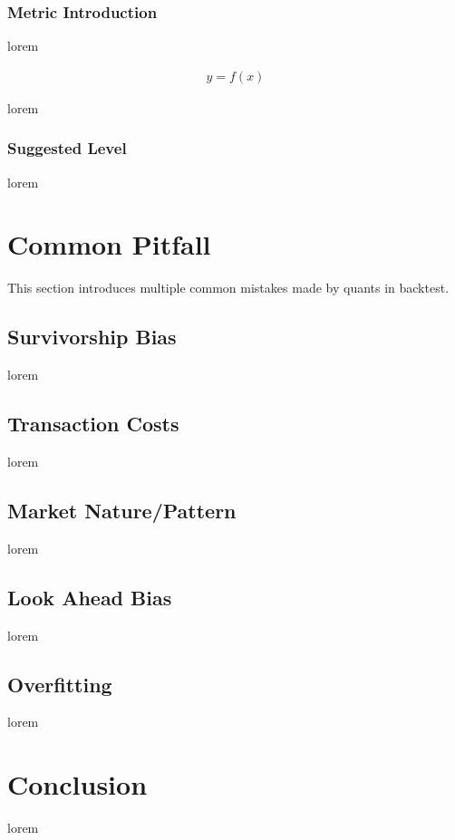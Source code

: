 \documentclass[12pt]{article}
\begin{document}
\subsubsection*{Metric Introduction}

lorem

\begin{align*}
  y = f(x)
\end{align*}

lorem

\subsubsection*{Suggested Level}

lorem

\section{Common Pitfall}

This section introduces multiple common mistakes made by quants in backtest.

\subsection{Survivorship Bias}

lorem

\subsection{Transaction Costs}

lorem

\subsection{Market Nature/Pattern}

lorem

\subsection{Look Ahead Bias}

lorem

\subsection{Overfitting}

lorem

\section*{Conclusion}

lorem

\renewcommand{\refname}{Reference} %
\printbibliography
\end{document}
